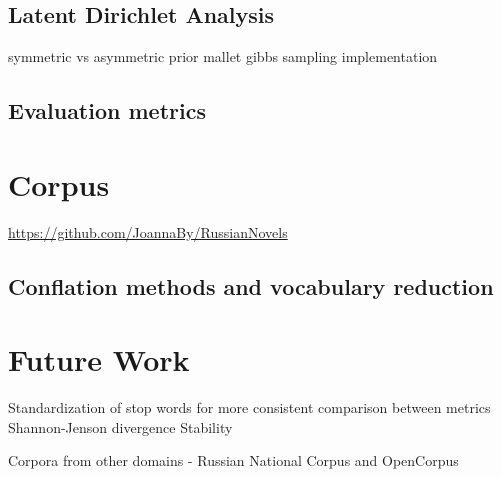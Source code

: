 \documentclass[11pt,a4paper]{article}
\begin{document}

\subsection{Latent Dirichlet Analysis}
symmetric vs asymmetric prior
mallet gibbs sampling implementation

\subsection{Evaluation metrics}

\section{Corpus}

\url{https://github.com/JoannaBy/RussianNovels}
\subsection{Conflation methods and vocabulary reduction}

\section{Future Work}
Standardization of stop words for more consistent comparison between metrics
Shannon-Jenson divergence
Stability


Corpora from other domains - Russian National Corpus and OpenCorpus



\end{document}
